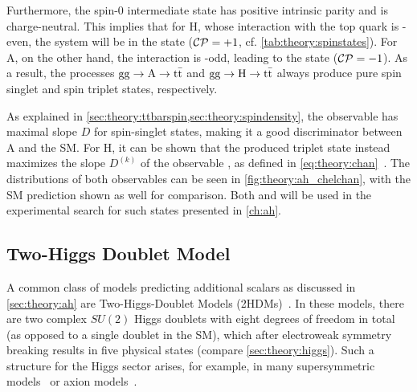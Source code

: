 Furthermore, the spin-0 intermediate state has positive intrinsic parity and is charge-neutral. This implies that for H, whose interaction with the top quark is \CP-even, the \ttbar system will be in the  state ($\mathcal{CP} = +1$, cf. \cref{tab:theory:spinstates}). For A, on the other hand, the interaction is \CP-odd, leading to the  state ($\mathcal{CP} = -1$). As a result, the processes $\mathrm{gg \rightarrow A \rightarrow \mathrm{t \bar{t}}}$ and $\mathrm{gg \rightarrow H \rightarrow \mathrm{t \bar{t}}}$ always produce pure spin singlet and spin triplet states, respectively.


As explained in \cref{sec:theory:ttbarspin,sec:theory:spindensity}, the observable \chel has maximal slope $D$ for spin-singlet states, making it a good discriminator between A and the SM. For H, it can be shown that the produced triplet state instead maximizes the slope $D^{(k)}$ of the observable \chan, as defined in \cref{eq:theory:chan}~\cite{Maltoni:2024tul}. The distributions of both observables can be seen in \cref{fig:theory:ah_chelchan}, with the SM prediction shown as well for comparison. Both \chel and \chan will be used in the experimental search for such states presented in \cref{ch:ah}.

\subsection{Two-Higgs Doublet Model}
\label{sec:theory:twohdm}

A common class of models predicting additional scalars as discussed in \cref{sec:theory:ah} are Two-Higgs-Doublet Models (2HDMs)~\cite{Lee:1973iz,Branco:2011iw}. In these models, there are two complex $SU(2)$ Higgs doublets with eight degrees of freedom in total (as opposed to a single doublet in the SM), which after electroweak symmetry breaking results in five physical states (compare \cref{sec:theory:higgs}). Such a structure for the Higgs sector arises, for example, in many supersymmetric models~\cite{Haber:1984rc} or axion models~\cite{Kim:1986ax}.

